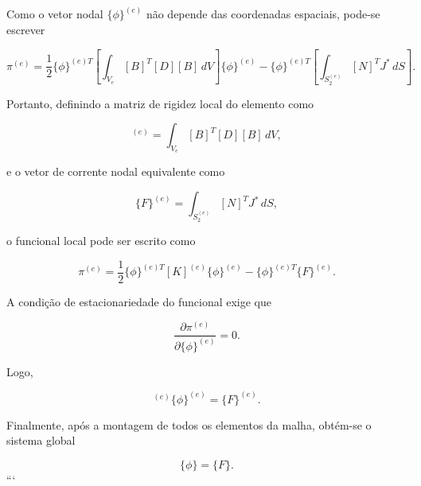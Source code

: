\documentclass[
12pt,
a4paper,
oneside,
chapter=TITLE,
sumario=tradicional
]{abntex2}
\begin{document}
    Como o vetor nodal $\{\phi\}^{(e)}$ não depende das coordenadas espaciais, pode-se escrever
    
    \begin{equation}
    	\pi^{(e)}
    	=
    	\frac{1}{2}
    	\{\phi\}^{(e)T}
    	\left[
    	\int_{V_e}
    	[B]^T[D][B]\,dV
    	\right]
    	\{\phi\}^{(e)}
    	-
    	\{\phi\}^{(e)T}
    	\left[
    	\int_{S_2^{(e)}}
    	[N]^T J^{*}\,dS
    	\right].
    	\tag{1.30}
    \end{equation}
    
    Portanto, definindo a matriz de rigidez local do elemento como
    
    \begin{equation}
    	[K]^{(e)}
    	=
    	\int_{V_e}
    	[B]^T[D][B]\,dV,
    	\tag{1.31}
    \end{equation}
    
    e o vetor de corrente nodal equivalente como
    
    \begin{equation}
    	\{F\}^{(e)}
    	=
    	\int_{S_2^{(e)}}
    	[N]^T J^{*}\,dS,
    	\tag{1.32}
    \end{equation}
    
    o funcional local pode ser escrito como
    
    \begin{equation}
    	\pi^{(e)}
    	=
    	\frac{1}{2}
    	\{\phi\}^{(e)T}
    	[K]^{(e)}
    	\{\phi\}^{(e)}
    	-
    	\{\phi\}^{(e)T}
    	\{F\}^{(e)}.
    	\tag{1.33}
    \end{equation}
    
    A condição de estacionariedade do funcional exige que
    
    \begin{equation}
    	\frac{\partial \pi^{(e)}}{\partial \{\phi\}^{(e)}}=0.
    	\tag{1.34}
    \end{equation}
    
    Logo,
    
    \begin{equation}
    	[K]^{(e)}
    	\{\phi\}^{(e)}
    	=
    	\{F\}^{(e)}.
    	\tag{1.35}
    \end{equation}
    
    Finalmente, após a montagem de todos os elementos da malha, obtém-se o sistema global
    
    \begin{equation}
    	[K]\{\phi\}=\{F\}.
    	\tag{1.36}
    \end{equation}
    ```
    
\end{document}
